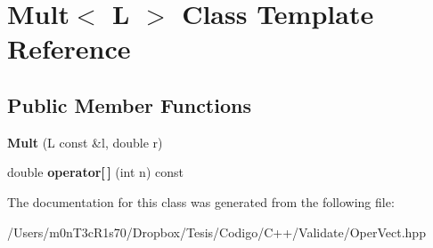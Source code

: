 \hypertarget{class_mult}{}\section{Mult$<$ L $>$ Class Template Reference}
\label{class_mult}
\subsection*{Public Member Functions}
\begin{DoxyCompactItemize}
\item 
\hypertarget{class_mult_a3e3bfa5c853d6eacdcbf322964c8f51b}{}\label{class_mult_a3e3bfa5c853d6eacdcbf322964c8f51b} 
{\bfseries Mult} (L const \&l, double r)
\item 
\hypertarget{class_mult_ae1b4c58331d5938b30509160ff16cdbf}{}\label{class_mult_ae1b4c58331d5938b30509160ff16cdbf} 
double {\bfseries operator\mbox{[}$\,$\mbox{]}} (int n) const
\end{DoxyCompactItemize}


The documentation for this class was generated from the following file\+:\begin{DoxyCompactItemize}
\item 
/\+Users/m0n\+T3c\+R1s70/\+Dropbox/\+Tesis/\+Codigo/\+C++/\+Validate/Oper\+Vect.\+hpp\end{DoxyCompactItemize}
